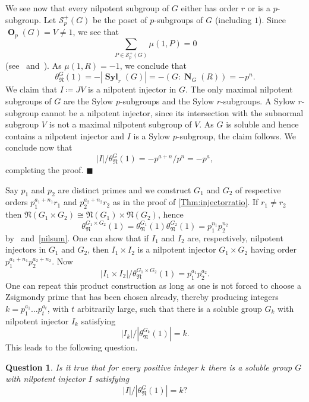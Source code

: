 \documentclass[10pt,a4paper]{amsart}
\numberwithin{equation}{section}
\DeclareMathOperator{\N}{\mathbf{N}}
\DeclareMathOperator{\oh}{\mathbf{O}}
\DeclareMathOperator{\syl}{\mathbf{Syl}}
\newcommand{\card}[1]{\left\lvert{#1}\right\rvert}
\newenvironment{proofofC}{{\bf {Proof of Theorem \ref{Thm:injectorratio}.} }}{\hfill $\blacksquare$ \\}
\def\NN{{\mathfrak N}}
\def\NS{\theta_\NN^G(1)}
\def\SS{{\mathcal S}}
\newtheorem{question}{Question}
\begin{document}
\begin{proofofC}
We see now that every nilpotent subgroup of $G$ either has order $r$ or is a $p$-subgroup.  
Let $\SS^+_p(G)$ be the poset of $p$-subgroups of $G$ (including $1$).  
Since $\oh_p(G) = V \neq 1$, we see that
\[
\sum_{P \in \SS^+_p(G)}\mu(1,P) = 0
\]
(see~\cite[Prop.~3.8.6]{StanleyEC1} and~\cite[Prop.~2.4]{Quillen}).  
As $\mu(1,R) = -1$, we conclude that
\begin{equation}\label{nilsum}
\NS = - \card{\syl_r(G)} = - (G : \N_G(R)) = -p^n.
\end{equation}
We claim that $I \coloneqq JV$ is a nilpotent injector in $G$.  
The only maximal nilpotent subgroups of $G$ 
are the Sylow $p$-subgroups and the Sylow $r$-subgroups.  
A Sylow $r$-subgroup cannot be a nilpotent injector, 
since its intersection with the subnormal subgroup $V$ 
is not a maximal nilpotent subgroup of $V$.  
As $G$ is soluble and hence contains a nilpotent injector 
and $I$ is a Sylow $p$-subgroup, the claim follows.  
We conclude now that
\[
|I| / \NS = -p^{a+n}/p^n = -p^a,
\]
completing the proof.
\end{proofofC}

Say $p_1$ and $p_2$ are distinct primes and we construct $G_1$ and $G_2$ of respective orders $p_1^{a_1+n_1}r_1$ and $p_2^{a_2+n_2}r_2$ as in the proof of \autoref{Thm:injectorratio}.  
If $r_1 \neq r_2$ then $\NN(G_1 \times G_2) \cong \NN(G_1) \times \NN(G_2)$, hence 
\[
\theta_\NN^{G_1 \times G_2}(1)=\theta_\NN^{G_1}(1) \theta_\NN^{G_2}(1)=p_1^{n_1}p_2^{n_2}
\]
by~\cite[Prop. 3.8.2]{StanleyEC1} and~\eqref{nilsum}.  
One can show that if $I_1$ and $I_2$ are, respectively, nilpotent injectors in $G_1$ and $G_2$, then $I_1 \times I_2$ is a nilpotent injector $G_1 \times G_2$ having order $p_1^{a_1+n_1}p_2^{a_2+n_2}$.  
Now
\[
\card{I_1 \times I_2} / \theta_\NN^{G_1 \times G_2}(1) = p_1^{a_1}p_2^{a_2}.
\]
One can repeat this product construction 
as long as one is not forced to choose a Zsigmondy prime that has been chosen already, 
thereby producing integers $k = p_1^{a_1}\ldots p_t^{a_t}$, with $t$ arbitrarily large, 
such that there is a soluble group $G_k$ with nilpotent injector $I_k$ satisfying
\[
\card{I_k} / \card{\theta_\NN^{G_k}(1)} = k.
\]
This leads to the following question.

\begin{question}
Is it true that for every positive integer $k$ 
there is a soluble group $G$ with nilpotent injector $I$ satisfying
\[
\card{I} / \card{\NS} = k?
\]
\end{question}
\end{document}
